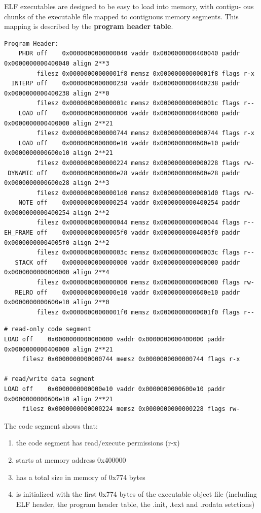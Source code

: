 \documentclass[11pt]{article}
\begin{document}
ELF executables are designed to be easy to load into memory, with contigu- ous chunks of the executable file mapped to contiguous memory segments. This mapping is described by the \textbf{program header table}.\\
\begin{verbatim}
Program Header:
    PHDR off    0x0000000000000040 vaddr 0x0000000000400040 paddr 0x0000000000400040 align 2**3
         filesz 0x00000000000001f8 memsz 0x00000000000001f8 flags r-x
  INTERP off    0x0000000000000238 vaddr 0x0000000000400238 paddr 0x0000000000400238 align 2**0
         filesz 0x000000000000001c memsz 0x000000000000001c flags r--
    LOAD off    0x0000000000000000 vaddr 0x0000000000400000 paddr 0x0000000000400000 align 2**21
         filesz 0x0000000000000744 memsz 0x0000000000000744 flags r-x
    LOAD off    0x0000000000000e10 vaddr 0x0000000000600e10 paddr 0x0000000000600e10 align 2**21
         filesz 0x0000000000000224 memsz 0x0000000000000228 flags rw-
 DYNAMIC off    0x0000000000000e28 vaddr 0x0000000000600e28 paddr 0x0000000000600e28 align 2**3
         filesz 0x00000000000001d0 memsz 0x00000000000001d0 flags rw-
    NOTE off    0x0000000000000254 vaddr 0x0000000000400254 paddr 0x0000000000400254 align 2**2
         filesz 0x0000000000000044 memsz 0x0000000000000044 flags r--
EH_FRAME off    0x00000000000005f0 vaddr 0x00000000004005f0 paddr 0x00000000004005f0 align 2**2
         filesz 0x000000000000003c memsz 0x000000000000003c flags r--
   STACK off    0x0000000000000000 vaddr 0x0000000000000000 paddr 0x0000000000000000 align 2**4
         filesz 0x0000000000000000 memsz 0x0000000000000000 flags rw-
   RELRO off    0x0000000000000e10 vaddr 0x0000000000600e10 paddr 0x0000000000600e10 align 2**0
         filesz 0x00000000000001f0 memsz 0x00000000000001f0 flags r--
\end{verbatim}



\begin{verbatim}
# read-only code segment
LOAD off    0x0000000000000000 vaddr 0x0000000000400000 paddr 0x0000000000400000 align 2**21
     filesz 0x0000000000000744 memsz 0x0000000000000744 flags r-x

# read/write data segment
LOAD off    0x0000000000000e10 vaddr 0x0000000000600e10 paddr 0x0000000000600e10 align 2**21
     filesz 0x0000000000000224 memsz 0x0000000000000228 flags rw-
\end{verbatim}
The code segment shows that:\\
\begin{enumerate}
\item the code segment has read/execute permissions (r-x)\\
\item starts at memory address 0x400000\\
\item has a total size in memory of 0x774 bytes\\
\item is initialized with the first 0x774 bytes of the executable object file (including ELF header, the program header table, the .init, .text and .rodata setctions)\\
\end{enumerate}
\end{document}
